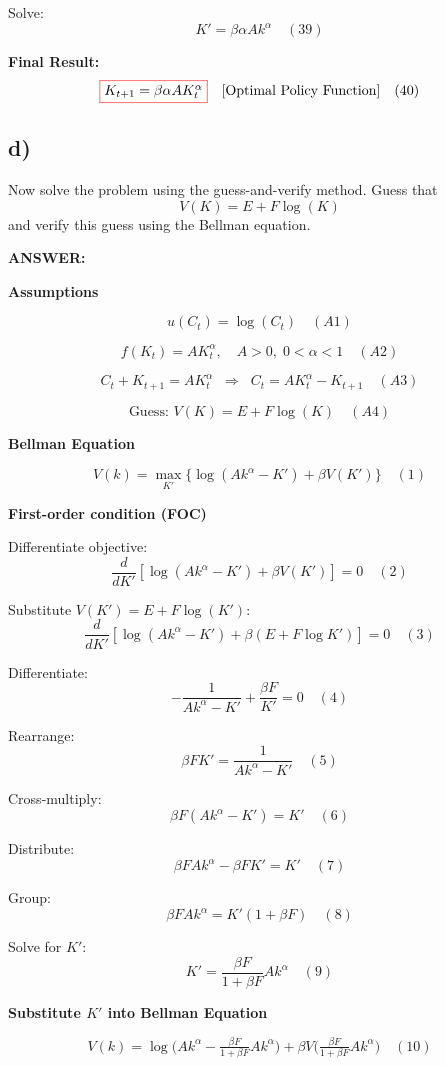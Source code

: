 \documentclass[12pt]{article}
\begin{document}
Solve:
\[
K'=\beta\alpha Ak^{\alpha} \quad (39)
\]

\textbf{Final Result:}
\[
\fcolorbox{red}{white}{$
K_{t+1}=\beta\alpha A K_t^{\alpha}
$}
\quad \text{[Optimal Policy Function]} \quad (40)
\]


\subsection*{\textbf{d)}}

Now solve the problem using the guess-and-verify method. Guess that 
\[
V(K) = E + F \log(K)
\]
and verify this guess using the Bellman equation.

\vspace{0.5em}
\noindent\textcolor{formalred}{\textbf{ANSWER:}}


\textbf{Assumptions}

\[
u(C_t)=\log(C_t) \quad (A1)
\]

\[
f(K_t)=A K_t^{\alpha}, \quad A>0, \; 0<\alpha<1 \quad (A2)
\]

\[
C_t+K_{t+1}=A K_t^{\alpha} \;\;\Rightarrow\;\; C_t=A K_t^{\alpha}-K_{t+1} \quad (A3)
\]

\[
\text{Guess: } V(K)=E+F\log(K) \quad (A4)
\]

\textbf{Bellman Equation}

\[
V(k)=\max_{K'}\{\log(Ak^{\alpha}-K')+\beta V(K')\} \quad (1)
\]

\textbf{First-order condition (FOC)}

Differentiate objective:
\[
\frac{d}{dK'}[\log(Ak^{\alpha}-K')+\beta V(K')]=0 \quad (2)
\]

Substitute \(V(K')=E+F\log(K')\):
\[
\frac{d}{dK'}[\log(Ak^{\alpha}-K')+\beta(E+F\log K')]=0 \quad (3)
\]

Differentiate:
\[
-\frac{1}{Ak^{\alpha}-K'}+\frac{\beta F}{K'}=0 \quad (4)
\]

Rearrange:
\[
\beta F K'=\frac{1}{Ak^{\alpha}-K'} \quad (5)
\]

Cross-multiply:
\[
\beta F(Ak^{\alpha}-K')=K' \quad (6)
\]

Distribute:
\[
\beta F Ak^{\alpha}-\beta F K'=K' \quad (7)
\]

Group:
\[
\beta F Ak^{\alpha}=K'(1+\beta F) \quad (8)
\]

Solve for \(K'\):
\[
K'=\frac{\beta F}{1+\beta F}Ak^{\alpha} \quad (9)
\]

\textbf{Substitute \(K'\) into Bellman Equation}

\[
V(k)=\log\!\Big(Ak^{\alpha}-\tfrac{\beta F}{1+\beta F}Ak^{\alpha}\Big)+\beta V\!\Big(\tfrac{\beta F}{1+\beta F}Ak^{\alpha}\Big) \quad (10)
\]
\end{document}
